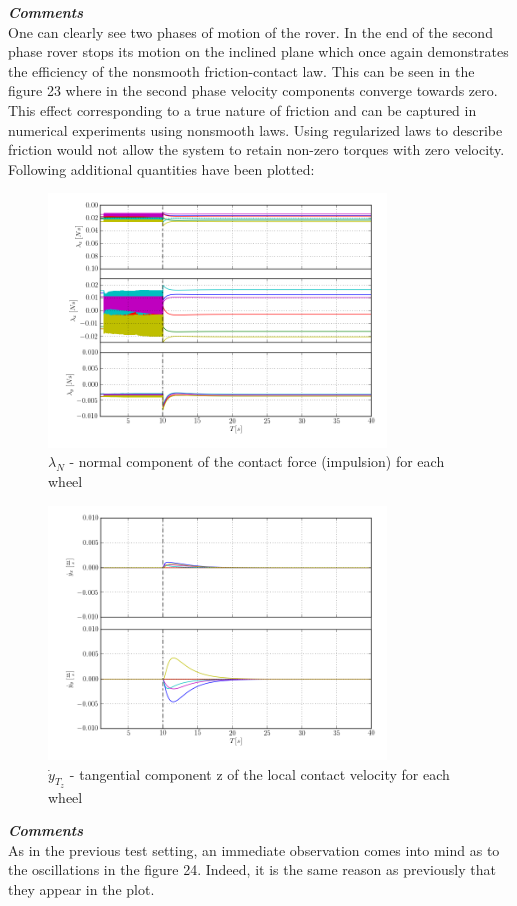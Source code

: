 \noindent \textbf{\textit{\Large{Comments}}}\\[1mm]
\noindent One can clearly see two phases of motion of the rover. In the end of the second phase rover stops its motion on the inclined plane which once again
demonstrates the efficiency of the nonsmooth friction-contact law. This can be seen in the figure 23 where in the second phase velocity components converge towards zero. 
This effect corresponding to a true nature of friction and can be captured in numerical experiments using nonsmooth laws. Using regularized laws to describe friction would not allow the system to retain non-zero torques with zero velocity.\\

\noindent Following additional quantities have been plotted:

\begin{figure}[H]
  \centering
    \includegraphics[width=0.8\textwidth]{lambdaNTS5}
  \caption{$\lambda_{N}$ - normal component of the contact force (impulsion) for each wheel}
\end{figure}

\begin{figure}[H]
  \centering
    \includegraphics[width=0.8\textwidth]{yTxdotyTzdot5}
  \caption{$\dot{y}_{T_z}$ - tangential component z of the local contact velocity for each wheel}
\end{figure}

\noindent \textbf{\textit{\Large{Comments}}}\\[1mm]
\noindent As in the previous test setting, an immediate observation comes into mind as to the oscillations in the figure 24. Indeed, it is the same reason as previously that they appear in the plot.\\

